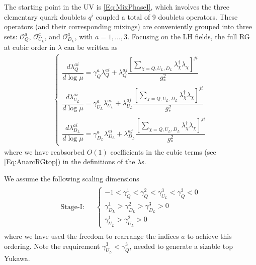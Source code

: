 \documentclass[aps,prl,twocolumn,showpacs,10pt,preprintnumbers,nofootinbib]{revtex4-2}
\begin{document}
{The starting point in the UV is \eqref{Eq:MixPhaseI}, which involves the three elementary quark doublets $q^i$ coupled a total of 9 doublets operators. These operators (and their corresponding mixings) are conveniently grouped into three sets: $\mathcal{O}_Q^a$, $\mathcal{O}_{U_L}^a$, and $\mathcal{O}_{D_L}^a$, with $a = 1, \ldots, 3$. Focusing on the LH fields, the full RG at cubic order in $\lambda$ can be written as
\begin{align}\label{Eq:GenRGtop}
\begin{cases}
    \dfrac{d \lambda_{Q}^{ai}}{d \log \mu} = \gamma_{Q}^a \lambda_{Q}^{ai} + \lambda_{Q}^{aj} \dfrac{\left[\sum_{\chi=Q,U_L,D_L}\lambda_{\chi}^{\dagger}\lambda_{\chi} \right]^{ji}}{g_*^2} \\
    \dfrac{d \lambda_{U_L}^{ai}}{d \log \mu} = \gamma_{U_L}^a \lambda_{U_L}^{ai} + \lambda_{U_L}^{aj} \dfrac{\left[\sum_{\chi=Q,U_L,D_L}\lambda_{\chi}^{\dagger}\lambda_{\chi} \right]^{ji}}{g_*^2} \\
    \dfrac{d \lambda_{D_L}^{ai}}{d \log \mu} = \gamma_{D_L}^a \lambda_{D_L}^{ai} + \lambda_{D_L}^{aj} \dfrac{\left[\sum_{\chi=Q,U_L,D_L}\lambda_{\chi}^{\dagger}\lambda_{\chi} \right]^{ji}}{g_*^2}
\end{cases}
\end{align}
where we have reabsorbed $O(1)$ coefficients in the cubic terms (see \eqref{Eq:AnarcRGtop}) in the definitions of the $\lambda$s.

We assume the following scaling dimensions 
\begin{align}
\begin{aligned}
\text{Stage-I:}&&
\begin{cases}
 -1<\gamma_Q^{1}<\gamma_Q^{2}<\gamma_{U_L}^3<\gamma_Q^{3}<0\\
\gamma_{D_L}^1>\gamma_{D_L}^2>\gamma_{D_L}^3>0\\
    \gamma_{U_L}^1 > \gamma_{U_L}^2>0
    \end{cases}
\end{aligned}
\end{align}
where we have used the freedom to rearrange the indices $a$ to achieve this ordering. Note the requirement $\gamma_{U_L}^3<\gamma_Q^3$, needed to generate a sizable top Yukawa. 

}
\end{document}

